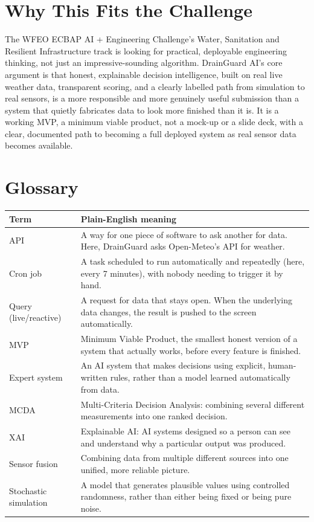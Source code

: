 \documentclass[11pt]{article}
\begin{document}
\section{Why This Fits the Challenge}
The WFEO ECBAP AI + Engineering Challenge's Water, Sanitation and Resilient Infrastructure track is looking for practical, deployable engineering thinking, not just an impressive-sounding algorithm. DrainGuard AI's core argument is that honest, explainable decision intelligence, built on real live weather data, transparent scoring, and a clearly labelled path from simulation to real sensors, is a more responsible and more genuinely useful submission than a system that quietly fabricates data to look more finished than it is. It is a working MVP, a minimum viable product, not a mock-up or a slide deck, with a clear, documented path to becoming a full deployed system as real sensor data becomes available.

\section{Glossary}
\begin{center}
\small
\begin{tabular}{@{}p{3.2cm}p{10.4cm}@{}}
\toprule
\textbf{Term} & \textbf{Plain-English meaning} \\
\midrule
API & A way for one piece of software to ask another for data. Here, DrainGuard asks Open-Meteo's API for weather. \\
Cron job & A task scheduled to run automatically and repeatedly (here, every 7 minutes), with nobody needing to trigger it by hand. \\
Query (live/reactive) & A request for data that stays open. When the underlying data changes, the result is pushed to the screen automatically. \\
MVP & Minimum Viable Product, the smallest honest version of a system that actually works, before every feature is finished. \\
Expert system & An AI system that makes decisions using explicit, human-written rules, rather than a model learned automatically from data. \\
MCDA & Multi-Criteria Decision Analysis: combining several different measurements into one ranked decision. \\
XAI & Explainable AI: AI systems designed so a person can see and understand why a particular output was produced. \\
Sensor fusion & Combining data from multiple different sources into one unified, more reliable picture. \\
Stochastic simulation & A model that generates plausible values using controlled randomness, rather than either being fixed or being pure noise. \\
\bottomrule
\end{tabular}
\end{center}
\end{document}
